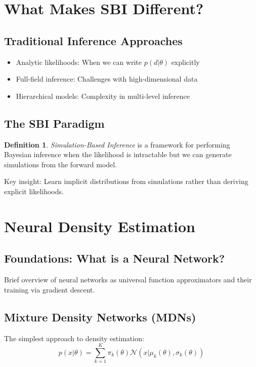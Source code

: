 \documentclass[11pt,a4paper]{article}
\theoremstyle{definition}
\newtheorem{definition}{Definition}[section]
\begin{document}
\section{What Makes SBI Different?}

\subsection{Traditional Inference Approaches}
\begin{itemize}
    \item Analytic likelihoods: When we can write $p(d|\theta)$ explicitly
    \item Full-field inference: Challenges with high-dimensional data
    \item Hierarchical models: Complexity in multi-level inference
\end{itemize}

\subsection{The SBI Paradigm}
\begin{definition}
\emph{Simulation-Based Inference} is a framework for performing Bayesian inference when the likelihood is intractable but we can generate simulations from the forward model.
\end{definition}

Key insight: Learn implicit distributions from simulations rather than deriving explicit likelihoods.

\section{Neural Density Estimation}

\subsection{Foundations: What is a Neural Network?}
Brief overview of neural networks as universal function approximators and their training via gradient descent.

\subsection{Mixture Density Networks (MDNs)}
The simplest approach to density estimation:
\begin{equation}
    p(x|\theta) = \sum_{k=1}^K \pi_k(\theta) \mathcal{N}(x | \mu_k(\theta), \sigma_k(\theta))
\end{equation}
\end{document}

